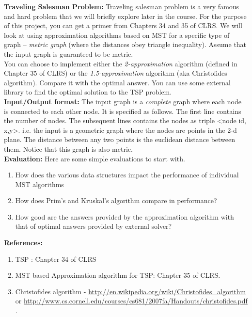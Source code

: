 \documentclass[12pt]{article}
\begin{document}
{\bf Traveling Salesman Problem:} Traveling salesman problem is a very famous and hard problem that we will briefly explore later in the course. For the purpose of this project, you can get a primer from Chapters 34 and 35 of CLRS. We will look at using approximation algorithms based on MST for a specific type of graph – {\em metric graph} (where the distances obey triangle inequality). Assume that the input graph is guaranteed to be metric.  \\

You can choose to implement either the {\em 2-approximation} algorithm (defined in Chapter 35 of CLRS) or the {\em 1.5-approximation} algorithm (aka Christofides algorithm). Compare it with the optimal answer. You can use some external library to find the optimal solution to the TSP problem.\\

{\bf Input/Output format:} The input graph is a {\em complete} graph where each node is connected to each other node. It is specified as follows. The first line contains the number of nodes. The subsequent lines contains the nodes as triple \textless        node id, x,y\textgreater. i.e. the input is a geometric graph where the nodes are points in the 2-d plane. The distance between any two points is the euclidean distance between them. Notice that this graph is also metric. \\

{\bf Evaluation:}  Here are some simple evaluations to start with. 
\begin{enumerate}
\item How does the various data structures impact the performance of individual MST algorithms
\item How does Prim's and Kruskal's algorithm compare in performance?
\item How good are the answers provided by the approximation algorithm with that of optimal answers provided by external solver?
\end{enumerate}

{\bf References:}
\begin{enumerate}
\item TSP : Chapter 34 of CLRS
\item MST based Approximation algorithm for TSP: Chapter 35 of CLRS.
\item Christofides algorithm - \url{http://en.wikipedia.org/wiki/Christofides_algorithm} or \url{http://www.cs.cornell.edu/courses/cs681/2007fa/Handouts/christofides.pdf} .
\end{enumerate}
\end{document}
